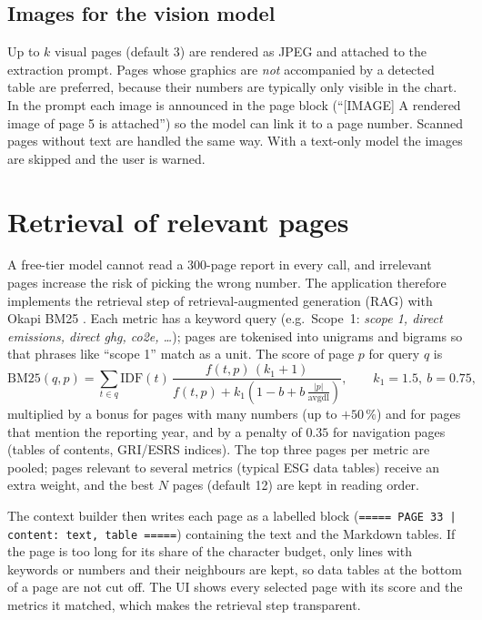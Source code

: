 \documentclass[11pt,a4paper]{article}
\newcommand{\code}[1]{\texttt{\small #1}}
\begin{document}
\subsection{Images for the vision model}
Up to $k$ visual pages (default 3) are rendered as JPEG and attached to the extraction prompt. Pages whose
graphics are \emph{not} accompanied by a detected table are preferred, because their numbers are typically
only visible in the chart. In the prompt each image is announced in the page block (``[IMAGE] A rendered
image of page 5 is attached'') so the model can link it to a page number. Scanned pages without text are
handled the same way. With a text-only model the images are skipped and the user is warned.

\section{Retrieval of relevant pages}\label{sec:retrieval}
A free-tier model cannot read a 300-page report in every call, and irrelevant pages increase the risk of
picking the wrong number. The application therefore implements the retrieval step of
retrieval-augmented generation (RAG) \cite{rag} with Okapi BM25 \cite{bm25}. Each metric has a keyword
query (e.g.\ Scope~1: \emph{scope 1, direct emissions, direct ghg, co2e, \ldots}); pages are tokenised
into unigrams and bigrams so that phrases like ``scope 1'' match as a unit. The score of page $p$ for
query $q$ is
\begin{equation}
\mathrm{BM25}(q,p)=\sum_{t\in q}\mathrm{IDF}(t)\,\frac{f(t,p)\,(k_1+1)}{f(t,p)+k_1\left(1-b+b\,\frac{|p|}{\mathrm{avgdl}}\right)},\qquad k_1=1.5,\ b=0.75,
\end{equation}
multiplied by a bonus for pages with many numbers (up to $+50\,\%$) and for pages that mention the
reporting year, and by a penalty of $0.35$ for navigation pages (tables of contents, GRI/ESRS indices).
The top three pages per metric are pooled; pages relevant to several metrics (typical ESG data tables)
receive an extra weight, and the best $N$ pages (default 12) are kept in reading order.

The context builder then writes each page as a labelled block (\code{===== PAGE 33 | content: text, table =====})
containing the text and the Markdown tables. If the page is too long for its share of the character
budget, only lines with keywords or numbers and their neighbours are kept, so data tables at the bottom of a
page are not cut off. The UI shows every selected page with its score and the metrics it matched, which
makes the retrieval step transparent.
\end{document}
